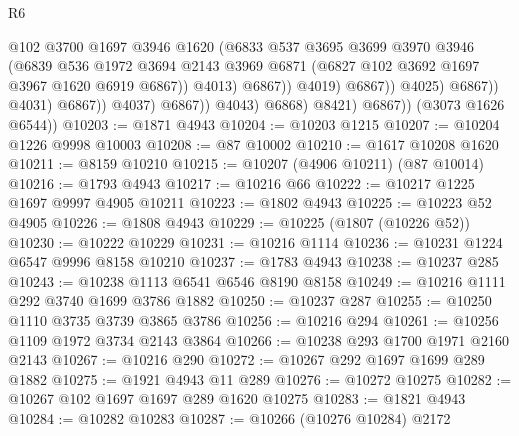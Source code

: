 \begin{lexlean}{R6}
\begin{coremodule}
                                            @102
                                            @3700
                                            @1697
                                            @3946
                                            @1620
                                            (@6833
                                              @537
                                              @3695
                                              @3699
                                              @3970
                                              @3946
                                              (@6839
                                                @536
                                                @1972
                                                @3694
                                                @2143
                                                @3969
                                                @6871
                                                (@6827 @102 @3692 @1697 @3967 @1620 @6919 @6867))
                                              @4013)
                                            @6867))
                                        @4019)
                                      @6867))
                                  @4025)
                                @6867))
                            @4031)
                          @6867))
                      @4037)
                    @6867))
                @4043)
              @6868)
            @8421)
          @6867))
      (@3073 @1626 @6544))
@10203 := @1871 @4943
@10204 := @10203 @1215
@10207 := @10204 @1226 @9998 @10003
@10208 := @87 @10002
@10210 := @1617 @10208 @1620
@10211 := @8159 @10210
@10215 := @10207 (@4906 @10211) (@87 @10014)
@10216 := @1793 @4943
@10217 := @10216 @66
@10222 := @10217 @1225 @1697 @9997 @4905 @10211
@10223 := @1802 @4943
@10225 := @10223 @52 @4905
@10226 := @1808 @4943
@10229 := @10225 (@1807 (@10226 @52))
@10230 := @10222 @10229
@10231 := @10216 @1114
@10236 := @10231 @1224 @6547 @9996 @8158 @10210
@10237 := @1783 @4943
@10238 := @10237 @285
@10243 := @10238 @1113 @6541 @6546 @8190 @8158
@10249 := @10216 @1111 @292 @3740 @1699 @3786 @1882
@10250 := @10237 @287
@10255 := @10250 @1110 @3735 @3739 @3865 @3786
@10256 := @10216 @294
@10261 := @10256 @1109 @1972 @3734 @2143 @3864
@10266 := @10238 @293 @1700 @1971 @2160 @2143
@10267 := @10216 @290
@10272 := @10267 @292 @1697 @1699 @289 @1882
@10275 := @1921 @4943 @11 @289
@10276 := @10272 @10275
@10282 := @10267 @102 @1697 @1697 @289 @1620 @10275
@10283 := @1821 @4943
@10284 := @10282 @10283
@10287 := @10266 (@10276 @10284) @2172

\end{coremodule}
\end{lexlean}
